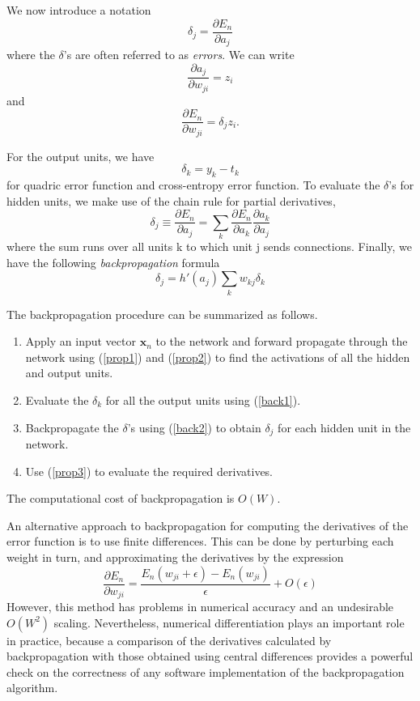 \documentclass[a4paper]{report}
\renewcommand{\bf}{\mathbf}
\newcommand{\imp}[1]{{\color{blue}\textit{#1}}}
\begin{document}
We now introduce a notation
\begin{equation}
	\delta_j = \frac{\partial E_n}{\partial a_j}
\end{equation}
where the $\delta$'s are often referred to as \imp{errors}. We can write
\begin{equation}
	\frac{\partial a_j}{\partial w_{ji}} = z_i 
\end{equation}
and
\begin{equation}
	\frac{\partial E_n}{\partial w_{ji}} = \delta_j z_i. \label{prop3}
\end{equation}

For the output units, we have
\begin{equation}
	\delta_k = y_k - t_k \label{back1}
\end{equation}
for quadric error function and cross-entropy error function. To evaluate the $\delta$'s for hidden units, we make use of the chain rule for partial derivatives,
\begin{equation}
	\delta_j \equiv \frac{\partial E_n}{\partial a_j} = \sum_k \frac{\partial E_n}{\partial a_k}\frac{\partial a_k}{\partial a_j}
\end{equation}
where the sum runs over all units k to which unit j sends connections. Finally, we have the following \emph{backpropagation} formula
\begin{equation}
	\delta_j = h'(a_j)\sum_k w_{kj} \delta_k \label{back2}
\end{equation}

The backpropagation procedure can be summarized as follows.
\begin{enumerate}
	\item Apply an input vector $\bf{x}_n$ to the network and forward propagate through the network using (\ref{prop1}) and (\ref{prop2}) to find the activations of all the hidden and output units.
	\item Evaluate the $\delta_k$ for all the output units using (\ref{back1}).
	\item Backpropagate the $\delta$'s using (\ref{back2}) to obtain $\delta_j$ for each hidden unit in the network.
	\item Use (\ref{prop3}) to evaluate the required derivatives.
\end{enumerate}
The computational cost of backpropagation is $O(W)$.

An alternative approach to backpropagation for computing the derivatives of the error function is to use finite differences. This can be done by perturbing each weight in turn, and approximating the derivatives by the expression
\begin{equation}
	\frac{\partial E_n}{\partial w_{ji}} = \frac{E_n(w_{ji}+\epsilon)-E_n(w_{ji})}{\epsilon} + O(\epsilon)
\end{equation}
However, this method has problems in numerical accuracy and an undesirable $O(W^2)$ scaling. Nevertheless, numerical differentiation plays an important role in practice, because a comparison of the derivatives calculated by backpropagation with those obtained using central differences provides a powerful check on the correctness of any software implementation of the backpropagation algorithm.
\end{document}
